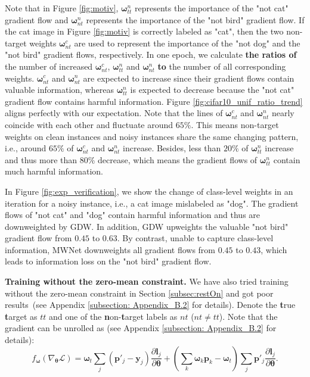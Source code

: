 %
Note that in Figure \ref{fig:motiv}, $\boldsymbol\omega^n_{tt}$ represents the importance of the "not cat" gradient flow and $\boldsymbol\omega^n_{nt}$ represents the importance of the "not bird" gradient flow.
%
If the cat image in Figure \ref{fig:motiv} is correctly labeled as "cat", then
the two non-target weights $\boldsymbol\omega^c_{nt}$ are used to represent the importance of the "not dog" and the "not bird" gradient flows, respectively.
%
In one epoch, we calculate \textbf{the ratios of} the number of increased $\boldsymbol\omega^c_{nt}$, $\boldsymbol\omega^{n}_{tt}$ and $\boldsymbol\omega^n_{nt}$ \textbf{to} the number of all corresponding weights.
%
$\boldsymbol\omega^c_{nt}$ and $\boldsymbol\omega^n_{nt}$ are expected to increase since their gradient flows contain valuable information,
whereas $\boldsymbol\omega^{n}_{tt}$ is expected to decrease because the "not cat" gradient flow contains harmful information.
%
Figure \ref{fig:cifar10_unif_ratio_trend} aligns perfectly with our expectation.
%
Note that the lines of $\boldsymbol\omega^c_{nt}$ and $\boldsymbol\omega^n_{nt}$ nearly coincide with each other and fluctuate around $65\%$.
%
This means non-target weights on clean instances and noisy instances share the same changing pattern, i.e., around $65\%$ of $\boldsymbol\omega^c_{nt}$ and $\boldsymbol\omega^n_{nt}$ increase.
%
Besides, less than $20\%$ of $\boldsymbol\omega^{n}_{tt}$ increase and thus more than $80\%$ decrease, which means the gradient flows of $\boldsymbol\omega^{n}_{tt}$ contain much harmful information.

%
In Figure \ref{fig:exp_verification}, we show the change of class-level weights in an iteration for a noisy instance, i.e., a cat image mislabeled as "dog".
%
The gradient flows of "not cat" and "dog" contain harmful information and thus are downweighted by GDW.
%
In addition, GDW upweights the valuable "not bird" gradient flow from $0.45$ to $0.63$.
%
By contrast, unable to capture class-level information, MWNet downweights all gradient flows from $0.45$ to $0.43$, which leads to information loss on the "not bird" gradient flow.

\noindent \textbf{Training without the zero-mean constraint.} We have also tried training without the zero-mean constraint in Section \ref{subsec:restOn} and got poor results~(see Appendix \ref{subsection: Appendix_B.2} for details).
%
Denote the \textbf{t}rue \textbf{t}arget as $tt$ and one of the \textbf{n}on-\textbf{t}arget labels as $nt$ ($nt\neq tt$). 
%
Note that the gradient can be unrolled as (see Appendix \ref{subsection: Appendix_B.2} for details):
\begin{equation} \label{eq2}
f_{\boldsymbol \omega}\left(\nabla_{\boldsymbol \theta} \mathcal{L}\right) = \boldsymbol{\omega}_t \sum_j\left({\boldsymbol{p}'_j}-\mathbf{y}_j\right)\frac{\partial \boldsymbol{l}_j}{\partial \boldsymbol \theta} + \left(\sum_k{{\boldsymbol {\omega}_k} {\boldsymbol{p}_k}}-\boldsymbol{\omega}_t\right) \sum_j {\boldsymbol{p}'_j}\frac{\partial \boldsymbol{l}_j}{\partial \boldsymbol \theta}.
\end{equation}

